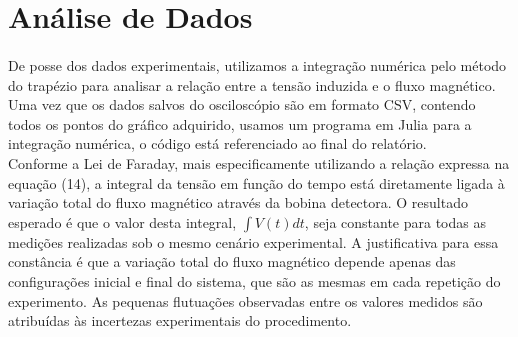 \documentclass[column,brazilian,12pt,a4paper,final]{article}
\begin{document}
\section{Análise de Dados}
\paragraph{}
De posse dos dados experimentais, utilizamos a integração numérica pelo método do trapézio para analisar a relação entre a tensão induzida e o fluxo magnético. Uma vez que os dados salvos do osciloscópio são em formato CSV, contendo todos os pontos do gráfico adquirido, usamos um programa em Julia para a integração numérica, o código está referenciado ao final do relatório.\\  
Conforme a Lei de Faraday, mais especificamente utilizando a relação expressa na equação (14), a integral da tensão em função do tempo está diretamente ligada à variação total do fluxo magnético através da bobina detectora. O resultado esperado é que o valor desta integral, $\int V(t)dt$, seja constante para todas as medições realizadas sob o mesmo cenário experimental. A justificativa para essa constância é que a variação total do fluxo magnético depende apenas das configurações inicial e final do sistema, que são as mesmas em cada repetição do experimento. As pequenas flutuações observadas entre os valores medidos são atribuídas às incertezas experimentais do procedimento.\\
\end{document}
